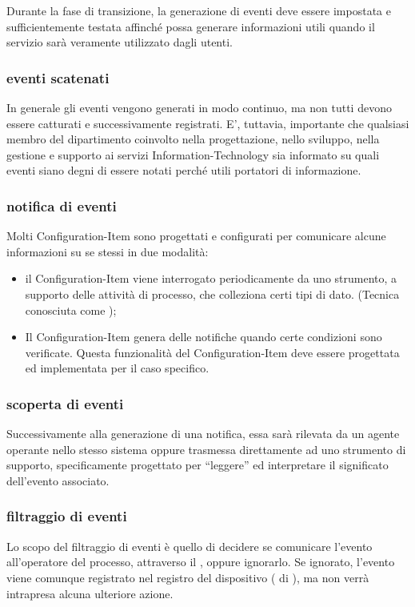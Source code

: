 Durante la fase di transizione, la generazione di eventi deve essere impostata e sufficientemente testata affinché possa generare informazioni utili quando il servizio sarà veramente utilizzato dagli utenti.

\subsubsection[Eventi scatenati]{eventi scatenati}
In generale gli eventi vengono generati in modo continuo, ma non tutti devono essere catturati e successivamente registrati. E', tuttavia, importante che qualsiasi membro del dipartimento coinvolto nella progettazione, nello sviluppo, nella gestione e supporto ai servizi \acs{Information-Technology} sia informato su quali eventi siano degni di essere notati perché utili portatori di informazione.

\subsubsection[Notifica di eventi]{notifica di eventi}
Molti \ac{Configuration-Item} sono progettati e configurati per comunicare alcune informazioni su se stessi in due modalità:

\begin{itemize}
\item{il \ac{Configuration-Item} viene interrogato periodicamente da uno strumento, a supporto delle attività di processo, che colleziona certi tipi di dato. (Tecnica conosciuta come );}
\item{Il \ac{Configuration-Item} genera delle notifiche quando certe condizioni sono verificate. Questa funzionalità del \ac{Configuration-Item} deve essere progettata ed implementata per il caso specifico.}
\end{itemize}

\subsubsection[Scoperta di eventi]{scoperta di eventi}
Successivamente alla generazione di una notifica, essa sarà rilevata da un agente operante nello stesso sistema oppure trasmessa direttamente ad uno strumento di supporto, specificamente progettato per ``leggere'' ed interpretare il significato dell'evento associato.

\subsubsection[Filtraggio di eventi]{filtraggio di eventi}
Lo scopo del filtraggio di eventi è quello di decidere se comunicare l'evento all'operatore del processo, attraverso il , oppure ignorarlo. Se ignorato, l'evento viene comunque registrato nel registro del dispositivo ( di ), ma non verrà intrapresa alcuna ulteriore azione.


